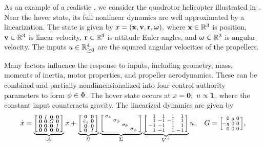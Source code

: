 
\label{sec:quadrotor}
As an example of a realistic \DDFproblem,
we consider the quadrotor helicopter illustrated in .
Near the hover state, its full nonlinear dynamics are well approximated by a linearization.
The state is given by
$
	x = (\mathbf{x}, \mathbf{v}, \mathbf{r}, \boldsymbol{\omega}),
$
where $\mathbf{x} \in \mathbb{R}^3$ is position,
$\mathbf{v} \in \mathbb{R}^3$ is linear velocity,
$\mathbf{r} \in \mathbb{R}^3$ is attitude Euler angles,
and $\boldsymbol{\omega} \in \mathbb{R}^3$ is angular velocity.
The inputs
$u \in \mathbb{R}^4_{\geq 0}$
are the squared angular velocities of the propellers.

Many factors influence the response to inputs,
including geometry, mass, moments of inertia, motor properties, and propeller aerodynamics.
These can be combined and partially nondimensionalized
into four control authority parameters to form $\phi \in \Phi$.
The hover state occurs at $x = \mathbf{0},\ u \propto \mathbf{1}$,
where the constant input counteracts gravity.
The linearized dynamics are given by
\newcommand{\Gmatrix}{\begin{bsmallmatrix*}[r] 0 & g & 0 \\ \hspace{-1mm}-g & 0 & 0 \\ 0 & 0 & 0 \\ \end{bsmallmatrix*}}
\begin{equation*}
\label{eq:quad-linearized}
	\dot x
	=
	\underbrace{
		\begin{bsmallmatrix}
			\zero &     I & \zero    & \zero \\
			\zero & \zero & G & \zero \\
			\zero & \zero & \zero    &     I \\
			\zero & \zero & \zero    & \zero \\
		\end{bsmallmatrix}
	}_A
	x
	+
	\underbrace{
		\begin{bsmallmatrix}
			\zero    & \zero \\
			\hat e_z & \zero \\
			\zero    & \zero \\
			\zero    &     I \\
		\end{bsmallmatrix}
	}_U
	\underbrace{
		\begin{bsmallmatrix}
			\sigma_z & & & \\
			& \sigma_\roll & & \\
			& & \sigma_\pitch & \\
			& & & \sigma_\yaw \\
		\end{bsmallmatrix}
	}_\Sigma
	\underbrace{
		\begin{bsmallmatrix*}[r]
			 1 &  1 &  1 &  1 \\
			 1 & -1 & -1 &  1 \\
			-1 & -1 &  1 &  1 \\
			 1 & -1 &  1 & -1 \\
		\end{bsmallmatrix*}
	}_{V^\top}
	u,
	\quad
	G = \Gmatrix,
\end{equation*}
